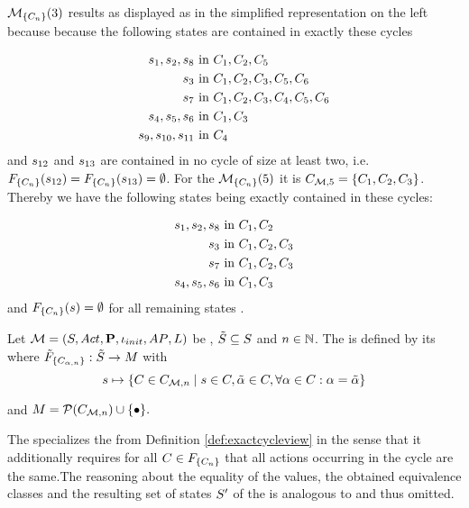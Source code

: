 \documentclass[preview]{standalone}
\begin{document}
\viewNC ${{{{{\mathcal{M}}}}_{{\{{C}_n\}}}}}(3)$ results as displayed as in the simplified representation on the left because because the following states are contained in exactly these cycles

\begin{align*}
	{s}_1, {s}_2, {s}_8 &\text{ in } {C}_1, {C}_2, {C}_5 \\
	{s}_3 &\text{ in } {C}_1, {C}_2, {C}_3, {C}_5, {C}_6 \\
	{s}_7 &\text{ in } {C}_1, {C}_2, {C}_3, {C}_4, {C}_5, {C}_6 \\
	{s}_4, {s}_5, {s}_6 &\text{ in } {C}_1, {C}_3 \\
	{s}_9, {s}_{10}, {s}_{11} &\text{ in } {C}_4
\end{align*}
and ${s}_{12}$ and ${s}_{13}$ are contained in no cycle of size at least two, i.e. ${{F_{{\{{C}_n\}}}}}({s}_{12}) = {{F_{{\{{C}_n\}}}}}({s}_{13}) = \emptyset$. For the ${{{{{\mathcal{M}}}}_{{\{{C}_n\}}}}}(5)$ it is ${C}_{{{{\mathcal{M}}}}, 5} = \{{C}_1, {C}_2, {C}_3\}$. Thereby we have the following states being exactly contained in these cycles:

\begin{align*}
	{s}_1, {s}_2, {s}_8 &\text{ in } {C}_1, {C}_2 \\
	{s}_3 &\text{ in } {C}_1, {C}_2, {C}_3 \\
	{s}_7 &\text{ in } {C}_1, {C}_2, {C}_3 \\
	{s}_4, {s}_5, {s}_6 &\text{ in } {C}_1, {C}_3 \\
\end{align*}
and ${{F_{{\{{C}_n\}}}}}({s}) = \emptyset$ for all remaining states \state.

\begin{definition}
	Let ${{{\mathcal{M}}}} = {{({S}, {Act}, {\textbf{P}}, {\iota_{init}}, {AP}, {L})}}$ be \achgphN, ${\tilde{{S}}} \subseteq {S}$ and $n \in {\mathbb{N}}$. The \viewN \viewexactactcycle is defined by its \grpfctN \gfctexactactcycle where ${{\tilde{F}_{{\{{C}_{{\alpha},n}\}}}}} : {\tilde{{S}}} \to {\ensuremath{{M}}}$ with
	\[
	\state \mapsto \{\cycle \in \cycleset \mid \state \in \cycle, \tilde{\action} \in \cycle, \forall \action \in \cycle : \action = \tilde{\action} \}
	\]
	
	and $\imggrp = \powerset{\cycleset} \cup \remset.$
\end{definition}

The \viewN specializes the \viewN from Definition \ref{def:exactcycleview} in the sense that it additionally requires for all ${C} \in {\ensuremath{{F_{{\{{C}_n\}}}}}}$ that all actions occurring in the cycle are the same.The reasoning about the equality of the \grpfctN values, the obtained equivalence classes and the resulting set of states ${S}'$ of the \viewN is analogous to \viewexactcycle and thus omitted.
\end{document}

